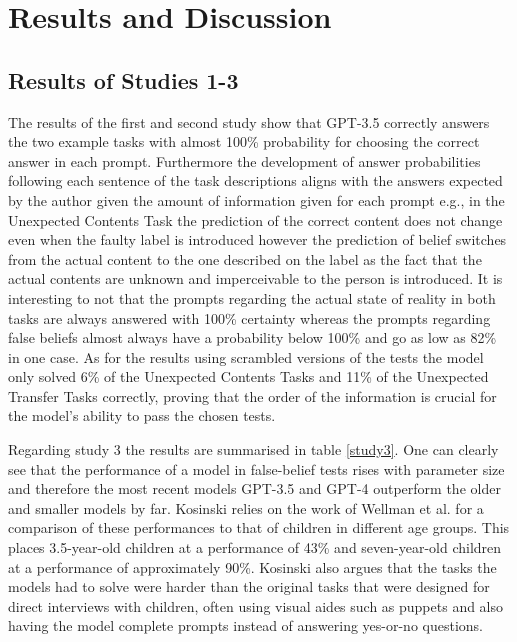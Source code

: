 \section{Results and Discussion}
\subsection{Results of Studies 1-3}
The results of the first and second study show that GPT-3.5 correctly answers the two example tasks with almost 100\% probability for choosing the correct answer in each prompt. Furthermore the development of answer probabilities following each sentence of the task descriptions aligns with the answers expected by the author given the amount of information given for each prompt e.g., in the Unexpected Contents Task the prediction of the correct content does not change even when the faulty label is introduced however the prediction of belief switches from the actual content to the one described on the label as the fact that the actual contents are unknown and imperceivable to the person is introduced. It is interesting to not that the prompts regarding the actual state of reality in both tasks are always answered with 100\% certainty whereas the prompts regarding false beliefs almost always have a probability below 100\% and go as low as 82\% in one case. As for the results using scrambled versions of the tests the model only solved 6\% of the Unexpected Contents Tasks and 11\% of the Unexpected Transfer Tasks correctly, proving that the order of the information is crucial for the model's ability to pass the chosen tests.

Regarding study 3 the results are summarised in table \ref{study3}. One can clearly see that the performance of a model in false-belief tests rises with parameter size and therefore the most recent models GPT-3.5 and GPT-4 outperform the older and smaller models by far. Kosinski relies on the work of Wellman et al. \cite{tom_children_2001} for a comparison of these performances to that of children in different age groups. This places 3.5-year-old children at a performance of 43\% and seven-year-old children at a performance of approximately 90\%. Kosinski also argues that the tasks the models had to solve were harder than the original tasks that were designed for direct interviews with children, often using visual aides such as puppets and also having the model complete prompts instead of answering yes-or-no questions.\cite{kosinski}


